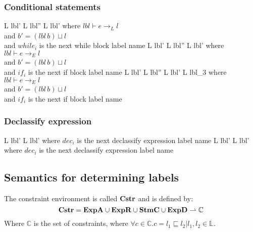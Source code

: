 \subsubsection{Conditional statements}

\begin{trules}
        { {L} {lbl'} }
        { {L} {lbl''} \;  {L} {lbl'} }
        {where $lbl \vdash e \rightarrow_L l$\\
          and $b' = (lbl \, b) \sqcup l$\\
          and $while_i$ is the next while block label name}
        { {L} {lbl'} }
        { {L} {lbl''} \;  {L} {lbl'} }
        {where $lbl \vdash e \rightarrow_E l$\\
          and $b' = (lbl \, b) \sqcup l$\\
          and $if_i$ is the next if block label name}
        { {L} {lbl'} }
        { {L} {lbl''} \;
           {L} {lbl'} \;
           {L} {lbl_3} }
        {where $lbl \vdash e \rightarrow_E l$\\
          and $b' = (lbl \, b) \sqcup l$\\
          and $if_i$ is the next if block label name}
\end{trules}

\subsubsection{Declassify expression}

\begin{trules}
        { {L} {lbl'} }
        { {L} {lbl'} }
        {where $dec_i$ is the next declassify expression label name}
        { {L} {lbl'} }
        { {L} {lbl'} }
        {where $dec_i$ is the next declassify expression label name}
\end{trules}

\subsection{Semantics for determining labels}
The constraint environment is called $\mathbf{Cstr}$ and is defined by:
\[
  \mathbf{Cstr} = \mathbf{ExpA} \cup \mathbf{ExpR} \cup \mathbf{StmC} \cup \mathbf{ExpD} \rightharpoonup \mathbb{C}
\]
Where $\mathbb{C}$ is the set of constraints, where $\forall c \in \mathbb{C} . c = l_1 \sqsubseteq l_2 | l_1, l_2 \in \mathbb{L}$.

